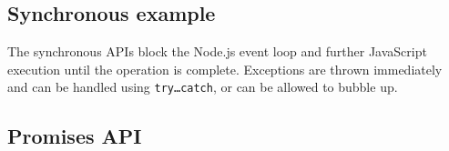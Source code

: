 \subsection{Synchronous example}\label{synchronous-example}

The synchronous APIs block the Node.js event loop and further JavaScript
execution until the operation is complete. Exceptions are thrown
immediately and can be handled using \texttt{try…catch}, or can be
allowed to bubble up.

\begin{Shaded}
\begin{Highlighting}[]
 \OperatorTok{;}

\NormalTok{ \{}
  \NormalTok{(}\NormalTok{)}\OperatorTok{;}
  \NormalTok{(}\NormalTok{)}\OperatorTok{;}
\NormalTok{\} }
\NormalTok{\}}
\end{Highlighting}
\end{Shaded}

\begin{Shaded}
\begin{Highlighting}[]
\OperatorTok{=} \NormalTok{(}\NormalTok{)}\OperatorTok{;}

\NormalTok{ \{}
  \NormalTok{(}\NormalTok{)}\OperatorTok{;}
  \NormalTok{(}\NormalTok{)}\OperatorTok{;}
\NormalTok{\} }
\NormalTok{\}}
\end{Highlighting}
\end{Shaded}

\subsection{Promises API}\label{promises-api}

